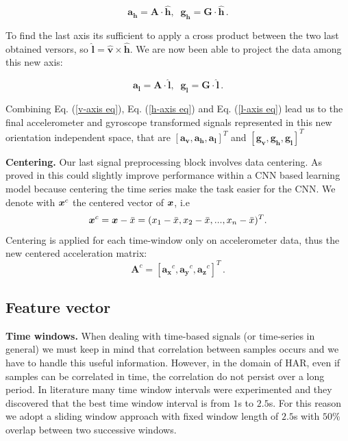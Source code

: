 \begin{equation}
	\label{h-axis eq}
	\boldsymbol{a_{h}} = \boldsymbol{A} \cdot \boldsymbol{\hat{h}} , \;\; \boldsymbol{g_{h}} = \boldsymbol{G} \cdot \boldsymbol{\hat{h}} \,.
\end{equation}

To find the last axis its sufficient to apply a cross product between the two last obtained versors, so $ \boldsymbol{\hat{l}} = \boldsymbol{\hat{v}} \times \boldsymbol{\hat{h}} $. We are now been able to project the data among this new axis:

\begin{equation}
	\label{l-axis eq}
	\boldsymbol{a_{l}} = \boldsymbol{A} \cdot \boldsymbol{\hat{l}} , \;\; \boldsymbol{g_{l}} = \boldsymbol{G} \cdot \boldsymbol{\hat{l}} \,.
\end{equation}

Combining Eq. (\ref{v-axis eq}), Eq. (\ref{h-axis eq}) and Eq. (\ref{l-axis eq}) lead us to the final accelerometer and gyroscope transformed signals represented in this new orientation independent space, that are $[\boldsymbol{a_{v}}, \boldsymbol{a_{h}}, \boldsymbol{a_{l}}]^T $ and $ [\boldsymbol{g_{v}}, \boldsymbol{g_{h}}, \boldsymbol{g_{l}}]^T $

\vspace{1em}
\textbf{Centering.}
Our last signal preprocessing block involves data centering. As proved in \cite{ignatov2018real} this could slightly
improve performance within a CNN based learning model because
centering the time series make the task easier for the CNN. We denote with $\boldsymbol{x}^{c}$ the centered vector of $\boldsymbol{x}$, i.e
\begin{equation}
  \label{eq:centering-func}
  \x^{c} = \x - \bar{x} = (x_1-\bar{x}, x_2-\bar{x},..., x_n-\bar{x})^T.
\end{equation}
Centering is applied for each time-window only on accelerometer data, thus the new centered acceleration matrix:
\begin{equation}
  \label{eq:centering-accelerometer-data}
  \boldsymbol{A}^{c} = [\boldsymbol{a_{x}}^{c}, \boldsymbol{a_{y}}^{c}, \boldsymbol{a_{z}}^{c}]^T \,.
\end{equation}


\subsection{Feature vector}
\label{subsec:feature-vector}

\textbf{Time windows.} When dealing with time-based signals (or
time-series in general) we must keep in mind that correlation between
samples occurs and we have to handle this useful information. However,
in the domain of HAR, even if samples can be correlated in time, the
correlation do not persist over a long period. In literature many time
window intervals were experimented \cite{ignatov2018real} and they
discovered that the best time window interval is from $1$s to
$2.5$s. For this reason we adopt a sliding window approach with fixed
window length of $2.5$s with $50$\% overlap between two successive
windows.

